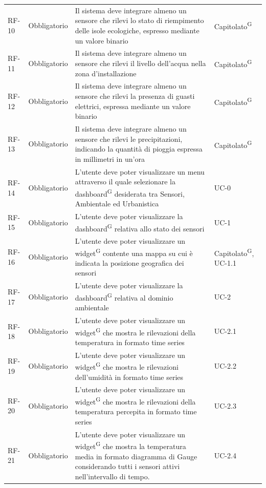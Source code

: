 \documentclass[8pt]{article}
\newcommand{\glossterm}[1]{#1\textsuperscript{G}} %
\begin{document}
\begin{longtable}{p{1.2cm} p{2cm} p{8cm} p{3cm}}
            RF-10 & Obbligatorio & Il sistema deve integrare almeno un sensore che rilevi lo stato di riempimento delle isole ecologiche, espresso mediante un valore binario & \glossterm{Capitolato} \\
            RF-11 & Obbligatorio & Il sistema deve integrare almeno un sensore che rilevi il livello dell'acqua nella zona d'installazione & \glossterm{Capitolato} \\
            RF-12 & Obbligatorio & Il sistema deve integrare almeno un sensore che rilevi la presenza di guasti elettrici, espressa mediante un valore binario & \glossterm{Capitolato} \\
            RF-13 & Obbligatorio & Il sistema deve integrare almeno un sensore che rilevi le precipitazioni, indicando la quantità di pioggia espressa in millimetri in un'ora & \glossterm{Capitolato} \\
            RF-14 & Obbligatorio & L'utente deve poter visualizzare un menu attraverso il quale selezionare la \glossterm{dashboard} desiderata tra Sensori, Ambientale ed Urbanistica & UC-0 \\
            RF-15 & Obbligatorio & L'utente deve poter visualizzare la \glossterm{dashboard} relativa allo stato dei sensori & UC-1 \\
            RF-16 & Obbligatorio & L'utente deve poter visualizzare un \glossterm{widget} contente una mappa su cui è indicata la posizione geografica dei sensori & \glossterm{Capitolato}, UC-1.1 \\
            RF-17 & Obbligatorio & L'utente deve poter visualizzare la \glossterm{dashboard} relativa al dominio ambientale & UC-2 \\
            RF-18 & Obbligatorio & L'utente deve poter visualizzare un \glossterm{widget} che mostra le rilevazioni della temperatura in formato time series & UC-2.1 \\
            RF-19 & Obbligatorio & L'utente deve poter visualizzare un \glossterm{widget} che mostra le rilevazioni dell'umidità in formato time series & UC-2.2 \\
            RF-20 & Obbligatorio & L'utente deve poter visualizzare un \glossterm{widget} che mostra le rilevazioni della temperatura percepita in formato time series & UC-2.3 \\
            RF-21 & Obbligatorio & L'utente deve poter visualizzare un \glossterm{widget} che mostra la temperatura media in formato diagramma di Gauge considerando tutti i sensori attivi nell'intervallo di tempo. & UC-2.4 \\

\end{longtable}
\end{document}
